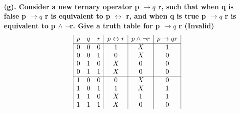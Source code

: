 \documentclass[a4paper]{article}
\begin{document}
\ \\\\\\
\textbf{(g). Consider a new ternary operator p $\rightarrow q$ r, such that when q is false p $\rightarrow q$ r is equivalent to p $\leftrightarrow $ r, and when q is true p $\rightarrow q$ r is equivalent to p $\wedge $ $\neg $r. Give a truth table for p $\rightarrow q$ r (Invalid)}
\begin{displaymath}
    \begin{array}{|c c c|c|c|c|}
        p & q & r & p \leftrightarrow r & p \wedge \neg r & p \rightarrow q r \\
        \hline
        0 & 0 & 0 & 1                   & X               & 1                 \\
        0 & 0 & 1 & 0                   & X               & 0                 \\
        0 & 1 & 0 & X                   & 0               & 0                 \\
        0 & 1 & 1 & X                   & 0               & 0                 \\
        \hline
        1 & 0 & 0 & 0                   & X               & 0                 \\
        1 & 0 & 1 & 1                   & X               & 1                 \\
        1 & 1 & 0 & X                   & 1               & 1                 \\
        1 & 1 & 1 & X                   & 0               & 0                 \\
    \end{array}
\end{displaymath}
\newpage
\end{document}
